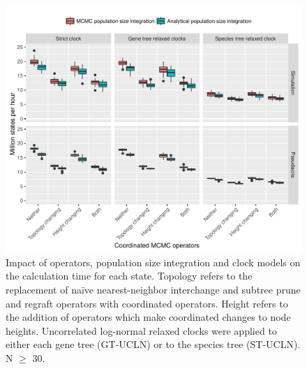 \documentclass[12pt]{article}
\begin{document}
\clearpage

\begin{figure}[htb!]
\centering
\includegraphics[width=\textwidth]{mstates_per_hour.pdf}
\caption
{Impact of operators, population size integration and clock models on
the calculation time for each state. Topology refers to the
replacement of na\"ive nearest-neighbor interchange and subtree prune and
regraft operators with coordinated operators. Height refers to the addition of
operators which make coordinated changes to node heights. Uncorrelated
log-normal relaxed clocks were applied to either each gene tree (GT-UCLN) or to
the species tree (ST-UCLN). N $\ge$ 30.}
\label{fig:mstatesPerHour}
\end{figure}

\clearpage

\end{document}
